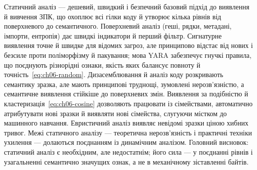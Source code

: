 Статичний аналіз --- дешевий, швидкий і безпечний базовий підхід до виявлення й вивчення ЗПК, що охоплює всі гілки коду й утворює кілька рівнів від поверхневого до семантичного. Поверхневий аналіз (геші, рядки, метадані, імпорти, ентропія) дає швидкі індикатори й перший фільтр. Сигнатурне виявлення точне й швидке для відомих загроз, але принципово відстає від нових і безсиле проти поліморфізму й пакування; мова YARA забезпечує гнучкі правила, що поєднують різнорідні ознаки, якість яких балансує повноту й точність~\eqref{eq:ch06-random}. Дизасемблювання й аналіз коду розкривають семантику зразка, але мають принципові труднощі, зумовлені нерозв'язністю, а семантичне виявлення стійкіше до поверхневих змін. Виявлення за подібністю й кластеризація~\eqref{eq:ch06-cosine} дозволяють працювати із сімействами, автоматично атрибутувати нові зразки й виявляти нові сімейства, слугуючи містком до машинного навчання. Евристичний аналіз виявляє невідомі зразки ціною хибних тривог. Межі статичного аналізу --- теоретична нерозв'язність і практичні техніки ухилення --- долаються поєднанням із динамічним аналізом. Головний висновок: статичний аналіз є необхідним, але недостатнім; його сила --- у поєднанні рівнів і узагальненні семантично значущих ознак, а не в механічному зіставленні байтів.

